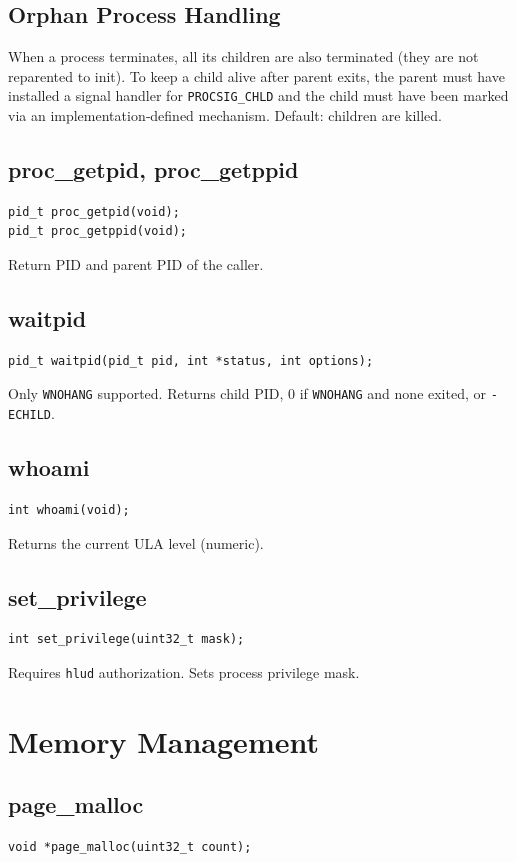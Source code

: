 \documentclass[12pt,a4paper]{article}
\begin{document}
\subsection{Orphan Process Handling}
When a process terminates, all its children are also terminated (they are not reparented to init). To keep a child alive after parent exits, the parent must have installed a signal handler for \texttt{PROCSIG\_CHLD} and the child must have been marked via an implementation‑defined mechanism. Default: children are killed.

\subsection{proc\_getpid, proc\_getppid}
\begin{lstlisting}
pid_t proc_getpid(void);
pid_t proc_getppid(void);
\end{lstlisting}
Return PID and parent PID of the caller.

\subsection{waitpid}
\begin{lstlisting}
pid_t waitpid(pid_t pid, int *status, int options);
\end{lstlisting}
Only \texttt{WNOHANG} supported. Returns child PID, 0 if \texttt{WNOHANG} and none exited, or \texttt{-ECHILD}.

\subsection{whoami}
\begin{lstlisting}
int whoami(void);
\end{lstlisting}
Returns the current ULA level (numeric).

\subsection{set\_privilege}
\begin{lstlisting}
int set_privilege(uint32_t mask);
\end{lstlisting}
Requires \texttt{hlud} authorization. Sets process privilege mask.

\section{Memory Management}

\subsection{page\_malloc}
\begin{lstlisting}
void *page_malloc(uint32_t count);
\end{lstlisting}
\end{document}
